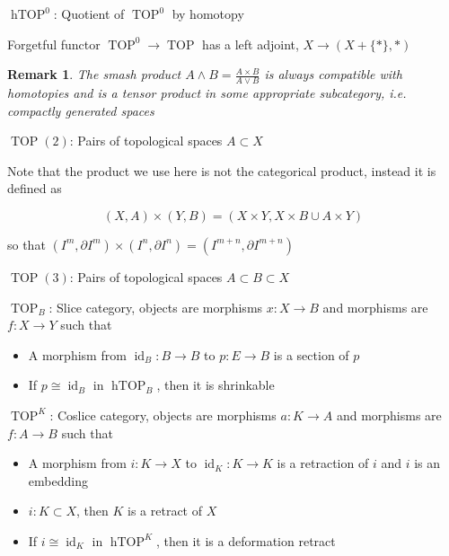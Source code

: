 \documentclass[12pt]{article}
\newtheorem*{rmk}{Remark}
\DeclareMathOperator{\id}{id}
\DeclareMathOperator{\TOP}{TOP}
\DeclareMathOperator{\hTOP}{hTOP}
\begin{document}
$\hTOP^0$: Quotient of $\TOP^0$ by homotopy

Forgetful functor $\TOP^0\to\TOP$ has a left adjoint, $X\to\left(X+\{*\},*\right)$

\begin{rmk}
    The smash product $A\wedge B=\frac{A\times B}{A\vee B}$ is always compatible with homotopies and is a tensor product in some appropriate subcategory, i.e. compactly generated spaces
\end{rmk}

$\TOP(2)$: Pairs of topological spaces $A\subset X$

Note that the product we use here is not the categorical product, instead it is defined as

\[(X,A)\times(Y,B)=(X\times Y,X\times B\cup A\times Y)\]

so that $\left(I^m,\partial I^m\right)\times\left(I^n,\partial I^n\right)=\left(I^{m+n},\partial I^{m+n}\right)$

$\TOP(3)$: Pairs of topological spaces $A\subset B\subset X$

$\TOP_B$: Slice category, objects are morphisms $x:X\to B$ and morphisms are $f:X\to Y$ such that
\begin{itemize}
    \item A morphism from $\id_B:B\to B$ to $p:E\to B$ is a section of $p$
    \item If $p\cong\id_B$ in $\hTOP_B$, then it is shrinkable
\end{itemize}

$\TOP^K$: Coslice category, objects are morphisms $a:K\to A$ and morphisms are $f:A\to B$ such that
\begin{itemize}
    \item A morphism from $i:K\to X$ to $\id_K:K\to K$ is a retraction of $i$ and $i$ is an embedding
    \item $i:K\subset X$, then $K$ is a retract of $X$
    \item If $i\cong\id_K$ in $\hTOP^K$, then it is a deformation retract
\end{itemize}
\end{document}
